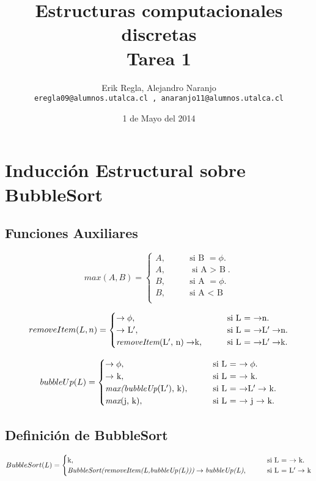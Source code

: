 \documentclass[11pt]{utalcaDoc}
\title{{\bf Estructuras computacionales discretas}\\Tarea 1}
\author{Erik Regla, Alejandro Naranjo \\ \tt{eregla09@alumnos.utalca.cl} , \tt{anaranjo11@alumnos.utalca.cl}}
\date{1 de Mayo del 2014}
\numberwithin{equation}{section}
\begin{document}
\renewcommand{\figurename}{Figura~}
\renewcommand{\tablename}{Tabla~}

\maketitle

\section{Inducción Estructural sobre BubbleSort}

\subsection{Funciones Auxiliares}
\[ max(A,B)=
 \begin{cases}
 A, \qquad& \text{si B $=\phi$}.\\
 A, \qquad& \text{si A $>$ B}.\\
 B, \qquad& \text{si A $=\phi$}.\\
 B, \qquad& \text{si A $<$ B}\\
\end{cases} \]

\[ removeItem(L,n)=
 \begin{cases}
 \to\phi, \qquad& \text{si L $= $ $\to$n}.\\
 \to$ L$', \qquad& \text{si L $=$ $\to$L$'\to$n}.\\
 \textit{removeItem}\text{(L$'$, n)}\to$k$,\qquad& \text{si L $=$ $\to$L$'\to$k}.
\end{cases} \]

\[ bubbleUp(L)=
 \begin{cases}
 \to\phi, \qquad& \text{si L $=$ $\to\phi$}.\\
 \to$ k$, \qquad& \text{si L $=$ $\to$ k}.\\
 \textit{max(bubbleUp}\text{(L$'$), k)}, \qquad& \text{si L $=$ $\to$L$'\to$ k}.\\
 \textit{max}\text{(j, k)}, \qquad& \text{si L $=$ $\to$ j $\to$ k}.
\end{cases} \]

\subsection{Definición de BubbleSort}
\[ BubbleSort(L)=
 \begin{cases}
 $k$, \qquad& \text{si L $=$ $\to$ k}.\\
 \textit{BubbleSort(removeItem(L,bubbleUp(L)))} \to \textit{bubbleUp(L)}, \qquad& \text{si L $=$ L$' \to$ k}\\
\end{cases} \]
\end{document}
